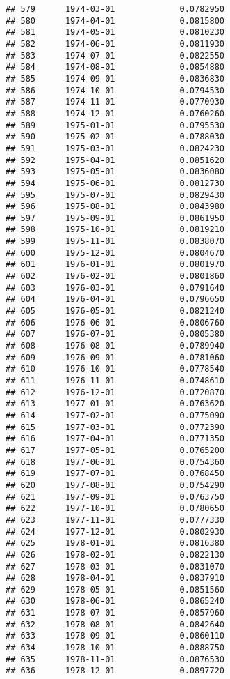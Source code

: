 \documentclass[
]{article}
\begin{document}
\begin{verbatim}
## 579      1974-03-01             0.0782950
## 580      1974-04-01             0.0815800
## 581      1974-05-01             0.0810230
## 582      1974-06-01             0.0811930
## 583      1974-07-01             0.0822550
## 584      1974-08-01             0.0854880
## 585      1974-09-01             0.0836830
## 586      1974-10-01             0.0794530
## 587      1974-11-01             0.0770930
## 588      1974-12-01             0.0760260
## 589      1975-01-01             0.0795530
## 590      1975-02-01             0.0788030
## 591      1975-03-01             0.0824230
## 592      1975-04-01             0.0851620
## 593      1975-05-01             0.0836080
## 594      1975-06-01             0.0812730
## 595      1975-07-01             0.0829430
## 596      1975-08-01             0.0843980
## 597      1975-09-01             0.0861950
## 598      1975-10-01             0.0819210
## 599      1975-11-01             0.0838070
## 600      1975-12-01             0.0804670
## 601      1976-01-01             0.0801970
## 602      1976-02-01             0.0801860
## 603      1976-03-01             0.0791640
## 604      1976-04-01             0.0796650
## 605      1976-05-01             0.0821240
## 606      1976-06-01             0.0806760
## 607      1976-07-01             0.0805380
## 608      1976-08-01             0.0789940
## 609      1976-09-01             0.0781060
## 610      1976-10-01             0.0778540
## 611      1976-11-01             0.0748610
## 612      1976-12-01             0.0720870
## 613      1977-01-01             0.0763620
## 614      1977-02-01             0.0775090
## 615      1977-03-01             0.0772390
## 616      1977-04-01             0.0771350
## 617      1977-05-01             0.0765200
## 618      1977-06-01             0.0754360
## 619      1977-07-01             0.0768450
## 620      1977-08-01             0.0754290
## 621      1977-09-01             0.0763750
## 622      1977-10-01             0.0780650
## 623      1977-11-01             0.0777330
## 624      1977-12-01             0.0802930
## 625      1978-01-01             0.0816380
## 626      1978-02-01             0.0822130
## 627      1978-03-01             0.0831070
## 628      1978-04-01             0.0837910
## 629      1978-05-01             0.0851560
## 630      1978-06-01             0.0865240
## 631      1978-07-01             0.0857960
## 632      1978-08-01             0.0842640
## 633      1978-09-01             0.0860110
## 634      1978-10-01             0.0888750
## 635      1978-11-01             0.0876530
## 636      1978-12-01             0.0897720

\end{verbatim}
\end{document}

